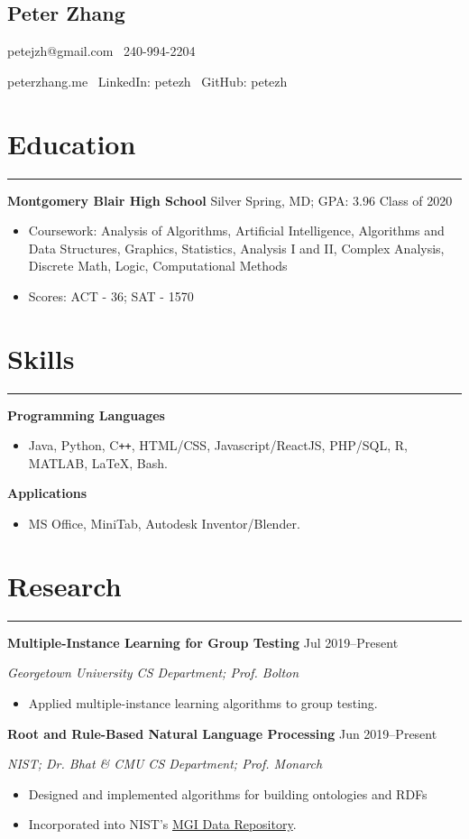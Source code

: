 \documentclass[12pt]{article}
\newcommand{\name}[1]{\begin{center}\section*{\huge \color{highlight} #1}\end{center}}
\newcommand{\topinfo}[1]{\begin{center}\vspace{-0.2cm}#1\vspace{-0.2cm}\end{center}}
\newcommand{\resumesection}[1]{\vspace{-0.3cm}\section*{\color{highlight}#1}\vspace{-0.3cm}\hrule\vspace{0.3cm}}
\begin{document}
\name{Peter Zhang}
\topinfo{petejzh@gmail.com  \textbullet\ 240-994-2204}
\topinfo{peterzhang.me \textbullet\ LinkedIn: petezh \textbullet\ GitHub: petezh}


\resumesection{Education}

\textbf{Montgomery Blair High School} Silver Spring, MD; GPA: 3.96 \hfill Class of 2020

\begin{itemize}
	\item Coursework: Analysis of Algorithms, Artificial Intelligence, Algorithms and Data Structures, Graphics, Statistics, Analysis I and II, Complex Analysis, Discrete Math, Logic, Computational Methods
	\item Scores: ACT - 36; SAT - 1570
\end{itemize}


\resumesection{Skills}


\textbf{Programming Languages}
\begin{itemize} 
	\item Java, Python, C\texttt{+}\texttt{+}, HTML/CSS, Javascript/ReactJS, PHP/SQL, R, MATLAB, \LaTeX, Bash.
\end{itemize}\vspace{0.1cm}

\textbf{Applications}
\begin{itemize} 
	\item MS Office, MiniTab, Autodesk Inventor/Blender.
\end{itemize}

\resumesection{Research}

\textbf{Multiple-Instance Learning for Group Testing} \hfill Jul 2019--Present\par
\textit{Georgetown University CS Department; Prof. Bolton}
\begin{itemize}
	\item Applied multiple-instance learning algorithms to group testing.
\end{itemize}\vspace{0.1cm}

\textbf{Root and Rule-Based Natural Language Processing}  \hfill Jun 2019--Present\par
\textit{NIST; Dr. Bhat \& CMU CS Department; Prof. Monarch}
\begin{itemize}
	\item Designed and implemented algorithms for building ontologies and RDFs
	\item Incorporated into NIST's \href{https://randr.nist.gov/mgi/default.aspx}{MGI Data Repository}.
\end{itemize}\vspace{0.1cm}
\end{document}
